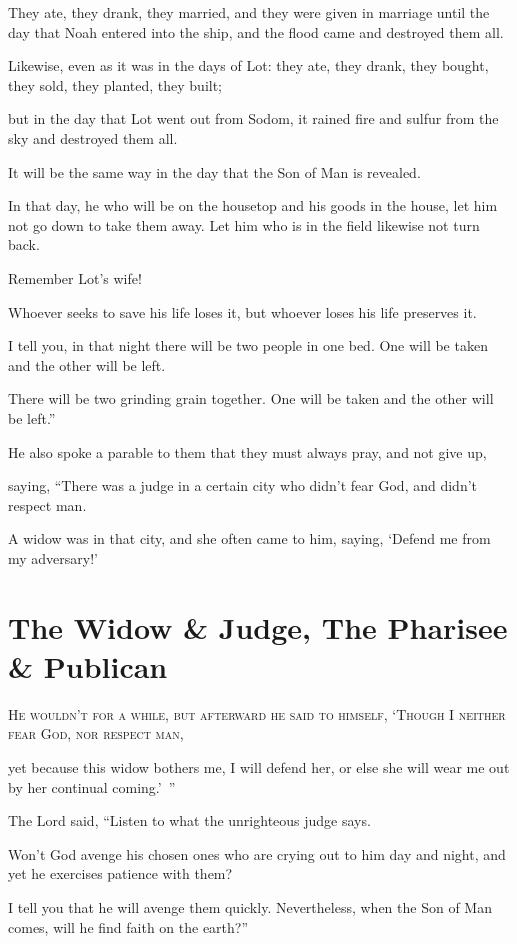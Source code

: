 They ate, they drank, they married, and they were given in marriage until the day that Noah entered into the ship, and the flood came and destroyed them all.

Likewise, even as it was in the days of Lot: they ate, they drank, they bought, they sold, they planted, they built;

but in the day that Lot went out from Sodom, it rained fire and sulfur from the sky and destroyed them all.

It will be the same way in the day that the Son of Man is revealed.

In that day, he who will be on the housetop and his goods in the house, let him not go down to take them away. Let him who is in the field likewise not turn back.

Remember Lot’s wife!

Whoever seeks to save his life loses it, but whoever loses his life preserves it.

I tell you, in that night there will be two people in one bed. One will be taken and the other will be left.

There will be two grinding grain together. One will be taken and the other will be left.”

He also spoke a parable to them that they must always pray, and not give up,

saying, “There was a judge in a certain city who didn’t fear God, and didn’t respect man.

A widow was in that city, and she often came to him, saying, ‘Defend me from my adversary!’


\clearpage \section*{The Widow \& Judge, The Pharisee \& Publican}

\lettrine{H}{e wouldn’t for a while, but afterward he said to himself, ‘Though I neither fear God, nor respect man,}

yet because this widow bothers me, I will defend her, or else she will wear me out by her continual coming.’ ”

The Lord said, “Listen to what the unrighteous judge says.

Won’t God avenge his chosen ones who are crying out to him day and night, and yet he exercises patience with them?

I tell you that he will avenge them quickly. Nevertheless, when the Son of Man comes, will he find faith on the earth?”

